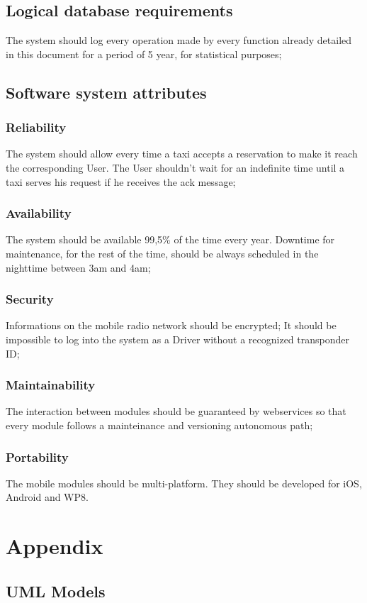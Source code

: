 \documentclass[12pt,a4paper]{book}
\begin{document}
		\section{Logical database requirements}
		The system should log every operation made by every function already detailed in this document for a period of 5 year, for statistical purposes; 
		\section{Software system attributes}
			\subsection{Reliability}
			The system should allow every time a taxi accepts a reservation to make it reach the corresponding User.
			The User shouldn't wait for an indefinite time until a taxi serves his request if he receives the ack message;
			\subsection{Availability}
			The system should be available 99,5\% of the time every year. Downtime for maintenance, for the rest of the time, should be always scheduled in the nighttime between 3am and 4am;
			\subsection{Security}
			Informations on the mobile radio network should be encrypted;
			It should be impossible to log into the system as a Driver without a recognized transponder ID;
			\subsection{Maintainability}
			The interaction between modules should be guaranteed by webservices so that every module follows a mainteinance and versioning autonomous path;
			\subsection{Portability}
			The mobile modules should be multi-platform. They should be developed for iOS, Android and WP8.
	\chapter{Appendix}
		\section{UML Models}
\end{document}
